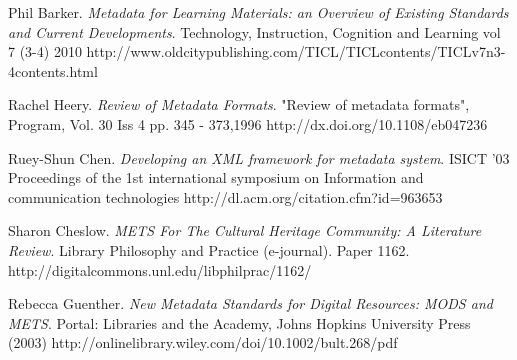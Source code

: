 \documentclass[a4paper]{article} %
\begin{document}

\begin{thebibliography}{99}
	Phil Barker.
	\newblock \emph{Metadata for Learning Materials: an Overview of Existing Standards and Current Developments}.
	\newblock Technology, Instruction, Cognition and Learning vol 7 (3-4) 2010
	\newblock http://www.oldcitypublishing.com/TICL/TICLcontents/TICLv7n3-4contents.html
	
	
	Rachel Heery.
	\newblock \emph{Review of Metadata Formats}.
	\newblock "Review of metadata formats", Program, Vol. 30 Iss 4 pp. 345 - 373,1996
	\newblock http://dx.doi.org/10.1108/eb047236
	
	Ruey-Shun Chen.
	\newblock \emph{Developing an XML framework for metadata system}.
	\newblock ISICT '03 Proceedings of the 1st international symposium on Information and communication technologies
	\newblock http://dl.acm.org/citation.cfm?id=963653
	
	Sharon Cheslow.
	\newblock \emph{METS For The Cultural Heritage Community: A	Literature Review}.
	\newblock Library Philosophy and Practice (e-journal). Paper 1162.
	\newblock http://digitalcommons.unl.edu/libphilprac/1162/
	
	Rebecca Guenther.
	\newblock \emph{New Metadata Standards for Digital Resources: MODS and METS}.
	\newblock Portal: Libraries and the Academy, Johns Hopkins University Press (2003)
	\newblock http://onlinelibrary.wiley.com/doi/10.1002/bult.268/pdf
	
\end{thebibliography}


\clearpage %
\end{document}
